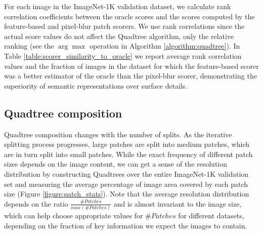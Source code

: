 For each image in the ImageNet-1K validation dataset, we calculate rank correlation coefficients between the oracle scores and the scores computed by the feature-based and pixel-blur patch scorers. We use rank correlations since the actual score values do not affect the Quadtree algorithm, only the relative ranking (see the $\arg\max$ operation in Algorithm \ref{algorithm:quadtree}). In Table \ref{table:scorer_similarity_to_oracle} we report average rank correlation values and the fraction of images in the dataset for which the feature-based scorer was a better estimator of the oracle than the pixel-blur scorer, demonstrating the superiority of semantic representations over surface details.


\subsection{Quadtree composition}
Quadtree composition changes with the number of splits. As the iterative splitting process progresses, large patches are split into medium patches, which are in turn split into small patches. While the exact frequency of different patch sizes depends on the image content, we can get a sense of the resolution distribution by constructing Quadtrees over the entire ImageNet-1K validation set and measuring the average percentage of image area covered by each patch size (Figure \ref{figure:patch_stats}). Note that the average resolution distribution depends on the ratio $\frac{\#Patches}{max(\#Patches)}$ and is almost invariant to the image size, which can help choose appropriate values for $\#Patches$ for different datasets, depending on the fraction of key information we expect the images to contain.


\begin{table}[t!]
\centering
\hspace*{-0.035\linewidth}
\caption{Average rank correlation between the patch rankings induced by the Grad-CAM oracle scorer and different realistic patch scorers, computed over the ImageNet-1K validation set.  ``\%~Score$_{Feat}$ better'' measures how frequently the oracle ranking is closer to the feature-based scorer than to the pixel-blur scorer.}
\label{table:scorer_similarity_to_oracle}
\end{table}


